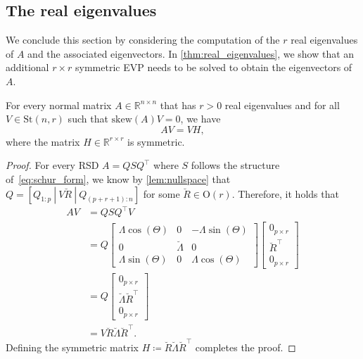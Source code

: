 \documentclass[10pt,twoside,dvipsnames]{siamart1116}
\numberwithin{algorithm}{section}
\numberwithin{equation}{section}
\begin{document}
	\subsection{The real eigenvalues}\label{subsec:r_nonzero} We conclude this section by considering the computation of the $r$ real eigenvalues of $A$ and the associated eigenvectors. In \cref{thm:real_eigenvalues}, we show that an additional $r\times r$ symmetric EVP needs to be solved to obtain the eigenvectors of $A$.
\begin{theorem}\label{thm:real_eigenvalues}
For every normal matrix $A\in\mathbb{R}^{n\times n}$ that has $r>0$ real eigenvalues and for all $V\in\mathrm{St}(n,r)$ such that $\mathrm{skew}(A)V=0$, we have 
	\begin{equation}
	\nonumber
		AV = VH,
	\end{equation}
	where the matrix $H\in\mathbb{R}^{r\times r}$ is symmetric.
	\end{theorem}
	\begin{proof} For every RSD $A=QSQ^\top $ where $S$ follows the structure of~\eqref{eq:schur_form}, we know by \cref{lem:nullspace} that $Q=[Q_{1:p}\ | \ V\breve{R}\ | \ Q_{(p+r+1):n}]$ for some $\breve{R}\in\mathrm{O}(r)$. Therefore, it holds that 
	\begin{align*}
	AV &= QSQ^\top V \\
	&=Q\begin{bmatrix}
	\Lambda\cos(\Theta)&0&-\Lambda\sin(\Theta)\\
	0&\breve{\Lambda}&0\\
	 \Lambda\sin(\Theta)&0&\Lambda\cos(\Theta)
	\end{bmatrix} \begin{bmatrix}
	0_{p\times r}\\
	\breve{R}^\top\\
	0_{p\times r}
	\end{bmatrix}\\
	&=Q\begin{bmatrix}
	0_{p\times r}\\
	\breve{\Lambda}\breve{R}^\top\\
	0_{p\times r}
	\end{bmatrix}\\
	&= V\breve{R} \breve{\Lambda} \breve{R}^\top .
	\end{align*}
	Defining the symmetric matrix $H\coloneq\breve{R}\breve{\Lambda}\breve{R}^\top $ completes the proof.
	\end{proof}	
\end{document}
